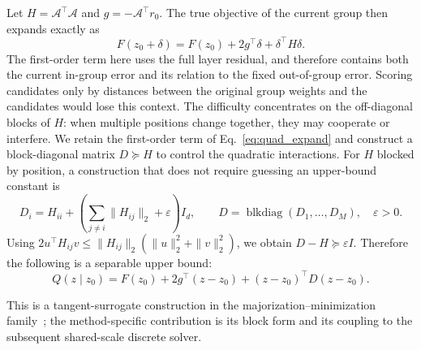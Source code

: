 Let $H=\mathcal A^\top\mathcal A$ and $g=-\mathcal A^\top r_0$. The true objective of the current group then expands exactly as
\begin{equation}
F(z_0+\delta)=F(z_0)+2g^\top\delta+\delta^\top H\delta.
\label{eq:quad_expand}
\end{equation}
The first-order term here uses the full layer residual, and therefore contains both the current in-group error and its relation to the fixed out-of-group error.
Scoring candidates only by distances between the original group weights and the candidates would lose this context.
The difficulty concentrates on the off-diagonal blocks of $H$: when multiple positions change together, they may cooperate or interfere.
We retain the first-order term of Eq.~\eqref{eq:quad_expand} and construct a block-diagonal matrix $D\succeq H$ to control the quadratic interactions.
For $H$ blocked by position, a construction that does not require guessing an upper-bound constant is
\begin{equation}
D_i=H_{ii}+\left(\sum_{j\ne i}\|H_{ij}\|_2+\varepsilon\right)I_d,
\qquad D=\operatorname{blkdiag}(D_1,\ldots,D_M),\quad \varepsilon>0.
\label{eq:D}
\end{equation}
Using $2u^\top H_{ij}v\le\|H_{ij}\|_2(\|u\|_2^2+\|v\|_2^2)$, we obtain $D-H\succeq\varepsilon I$.
Therefore the following is a separable upper bound:
\begin{equation}
Q(z\mid z_0)=F(z_0)+2g^\top(z-z_0)+(z-z_0)^\top D(z-z_0).
\label{eq:Q}
\end{equation}

This is a tangent-surrogate construction in the majorization--minimization family~\cite{mmtutorial}; the method-specific contribution is its block form and its coupling to the subsequent shared-scale discrete solver.

